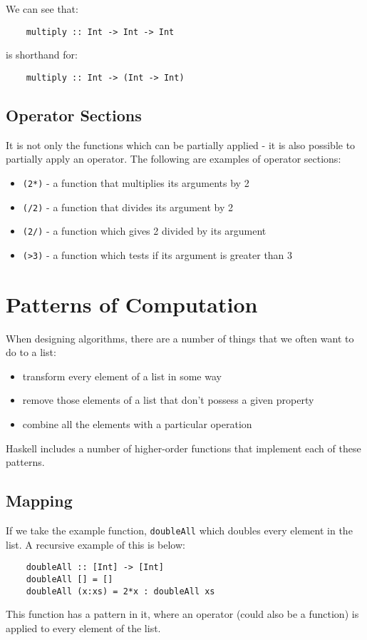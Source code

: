 We can see that:
\begin{verbatim}
    multiply :: Int -> Int -> Int
\end{verbatim}
is shorthand for:
\begin{verbatim}
    multiply :: Int -> (Int -> Int)
\end{verbatim}

\subsection{Operator Sections}
It is not only the functions which can be partially applied - it is also possible to partially apply an operator. The following are examples of operator sections:
\begin{itemize}
    \item \verb|(2*)| - a function that multiplies its arguments by 2
    \item \verb|(/2)| - a function that divides its argument by 2
    \item \verb|(2/)| - a function which gives 2 divided by its argument
    \item \verb|(>3)| - a function which tests if its argument is greater than 3
\end{itemize}


\section{Patterns of Computation}
When designing algorithms, there are a number of things that we often want to do to a list:
\begin{itemize}
    \item transform every element of a list in some way
    \item remove those elements of a list that don't possess a given property
    \item combine all the elements with a particular operation
\end{itemize}
Haskell includes a number of higher-order functions that implement each of these patterns.

\subsection{Mapping}
If we take the example function, \verb|doubleAll| which doubles every element in the list. A recursive example of this is below:
\begin{verbatim}
    doubleAll :: [Int] -> [Int]
    doubleAll [] = []
    doubleAll (x:xs) = 2*x : doubleAll xs
\end{verbatim}
This function has a pattern in it, where an operator (could also be a function) is applied to every element of the list.\\

